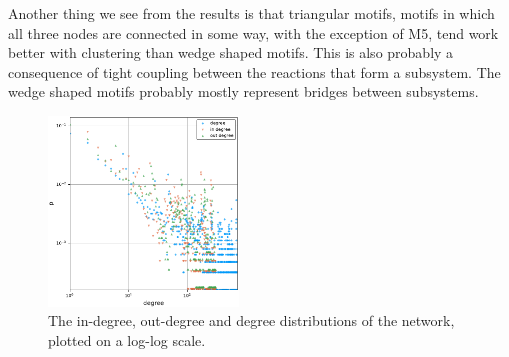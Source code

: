 Another thing we see from the results is that triangular motifs, motifs in
which all three nodes are connected in some way, with the exception of M5, tend
work better with clustering than wedge shaped motifs. This is also probably a
consequence of tight coupling between the reactions that form a subsystem. The
wedge shaped motifs probably mostly represent bridges between subsystems.

\begin{figure}
  \includegraphics[width=0.45\textwidth]{../plots/degreesmall2}
  \caption{The in-degree, out-degree and degree distributions of the network,
    plotted on a log-log scale.}
  \label{fig:dist}
\end{figure}

